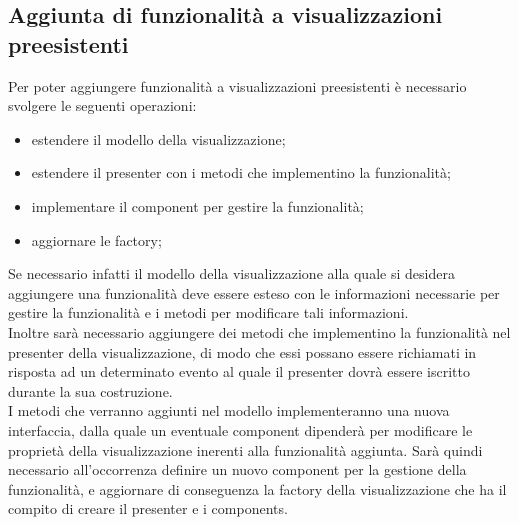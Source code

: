 \documentclass[../manuale_sviluppatore.tex]{subfiles}
\begin{document}
\subsection{Aggiunta di funzionalità a visualizzazioni preesistenti}
\label{sub:funzionalita}

Per poter aggiungere funzionalità a visualizzazioni preesistenti è necessario svolgere le seguenti 
operazioni:
\begin{itemize}
	\item estendere il modello della visualizzazione;
	\item estendere il presenter con i metodi che implementino la funzionalità;
	\item implementare il component per gestire la funzionalità;
	\item aggiornare le factory;
\end{itemize}

Se necessario infatti il modello della visualizzazione alla quale si desidera aggiungere una 
funzionalità deve essere esteso con le informazioni necessarie per gestire la funzionalità e i 
metodi per modificare tali informazioni.\\

Inoltre sarà necessario aggiungere dei metodi che implementino la funzionalità nel presenter della 
visualizzazione, di modo che essi possano essere richiamati in risposta ad un determinato evento al 
quale il presenter dovrà essere iscritto durante la sua costruzione.\\

I metodi che verranno aggiunti nel modello implementeranno una nuova interfaccia, dalla quale un 
eventuale component dipenderà per modificare le proprietà della visualizzazione inerenti alla 
funzionalità aggiunta. Sarà quindi necessario all'occorrenza definire un nuovo component per la 
gestione della funzionalità, e aggiornare di conseguenza la factory della visualizzazione che ha il 
compito di creare il presenter e i components.
\end{document}
